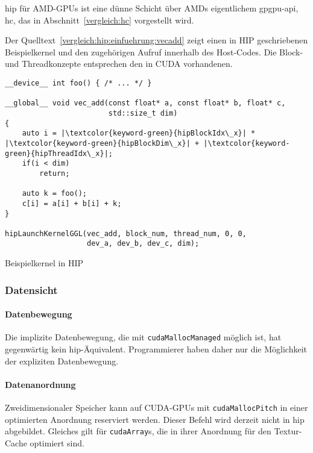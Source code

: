 \gls{hip} für AMD-GPUs ist eine dünne Schicht über AMDs eigentlichem
\gls{gpgpu}-\gls{api}, \gls{hc}, das in Abschnitt~\ref{vergleich:hc} vorgestellt
wird.

Der Quelltext~\ref{vergleich:hip:einfuehrung:vecadd} zeigt einen in HIP
geschriebenen Beispielkernel und den zugehörigen Aufruf innerhalb des
Host-Codes. Die Block- und Threadkonzepte entsprechen den in CUDA vorhandenen.

\begin{code}
    \begin{verbatim}
__device__ int foo() { /* ... */ }

__global__ void vec_add(const float* a, const float* b, float* c,
                        std::size_t dim)
{
    auto i = |\textcolor{keyword-green}{hipBlockIdx\_x}| * |\textcolor{keyword-green}{hipBlockDim\_x}| + |\textcolor{keyword-green}{hipThreadIdx\_x}|;
    if(i < dim)
        return;

    auto k = foo();
    c[i] = a[i] + b[i] + k;
}

hipLaunchKernelGGL(vec_add, block_num, thread_num, 0, 0,
                   dev_a, dev_b, dev_c, dim);
    \end{verbatim}
    \caption{Beispielkernel in HIP}
    \label{vergleich:hip:einfuehrung:vecadd}
\end{code}

\subsubsection{Datensicht}

\paragraph{Datenbewegung}

Die implizite Datenbewegung, die mit \texttt{cudaMallocManaged} möglich ist,
hat gegenwärtig kein \gls{hip}-Äquivalent. Programmierer haben daher nur die
Möglichkeit der expliziten Datenbewegung.

\paragraph{Datenanordnung}

Zweidimensionaler Speicher kann auf CUDA-GPUs mit \texttt{cudaMallocPitch} in
einer optimierten Anordnung reserviert werden. Dieser Befehl wird derzeit nicht
in \gls{hip} abgebildet. Gleiches gilt für \texttt{cudaArray}s, die in ihrer
Anordnung für den Textur-Cache optimiert sind.

